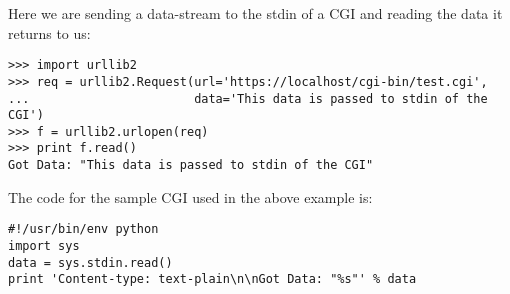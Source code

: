Here we are sending a data-stream to the stdin of a CGI and reading
the data it returns to us:

\begin{verbatim}
>>> import urllib2
>>> req = urllib2.Request(url='https://localhost/cgi-bin/test.cgi',
...                       data='This data is passed to stdin of the CGI')
>>> f = urllib2.urlopen(req)
>>> print f.read()
Got Data: "This data is passed to stdin of the CGI"
\end{verbatim}

The code for the sample CGI used in the above example is:

\begin{verbatim}
#!/usr/bin/env python
import sys
data = sys.stdin.read()
print 'Content-type: text-plain\n\nGot Data: "%s"' % data
\end{verbatim}
